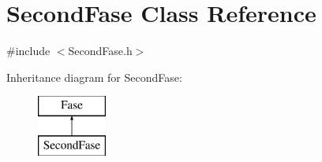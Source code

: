 \hypertarget{class_second_fase}{}\section{Second\+Fase Class Reference}
\label{class_second_fase}


{\ttfamily \#include $<$Second\+Fase.\+h$>$}

Inheritance diagram for Second\+Fase\+:\begin{figure}[H]
\begin{center}
\leavevmode
\includegraphics[height=2.000000cm]{class_second_fase}
\end{center}
\end{figure}
